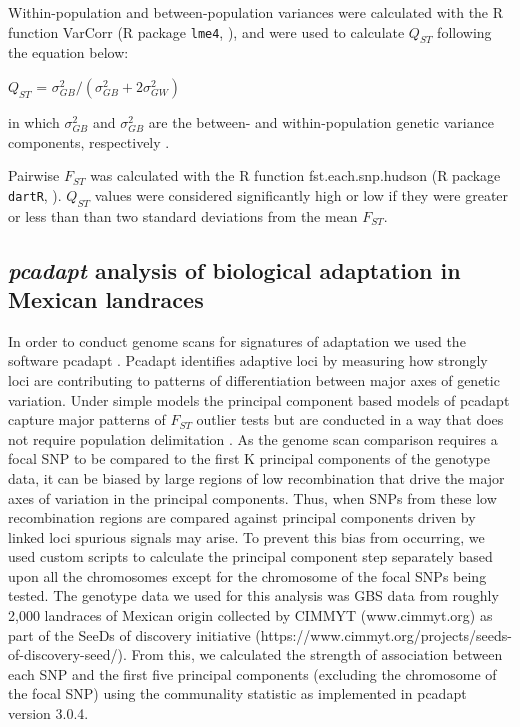 \documentclass[9pt,twocolumn,twoside,lineno]{gsajnl}
\begin{document}
Within-population and between-population variances were calculated with the R function VarCorr (R package \texttt{lme4}, \citealp{bates2014lme4}), and were used to calculate $Q_{ST}$ following the equation below:

\begin{center}
$Q_{ST}$ = \(\sigma^{2}_{GB}/(\sigma^{2}_{GB}+2\sigma^{2}_{GW})\)
\end{center}

\noindent in which $\sigma^{2}_{GB}$ and $\sigma^{2}_{GB}$ are the between- and within-population genetic variance components, respectively \citep{Leinonen2013-ic}.

Pairwise $F_{ST}$ was calculated with the R function fst.each.snp.hudson (R package \texttt{dartR}, \citealp{gruber2018dartr}).
$Q_{ST}$ values were considered significantly high or low if they were greater or less than than two standard deviations from the mean $F_{ST}$.


\subsection{\textit{pcadapt} analysis of biological adaptation in Mexican landraces}

In order to conduct genome scans for signatures of adaptation we used the software pcadapt \citep{Luu2017-ws}.
Pcadapt identifies adaptive loci by measuring how strongly loci are contributing to patterns of differentiation between major axes of genetic variation.
Under simple models the principal component based models of pcadapt capture major patterns of $F_{ST}$ outlier tests but are conducted in a way that does not require population delimitation \citep{duforet2014genome}.
As the genome scan comparison requires a focal SNP to be compared to the first K principal components of the genotype data, it can be biased by large regions of low recombination that drive the major axes of variation in the principal components.
Thus, when SNPs from these low recombination regions are compared against principal components driven by linked loci spurious signals may arise.
To prevent this bias from occurring, we used custom scripts to calculate the principal component step separately based upon all the chromosomes except for the chromosome of the focal SNPs being tested.
The genotype data we used for this analysis was GBS data from roughly 2,000 landraces of Mexican origin collected by CIMMYT (www.cimmyt.org) as part of the SeeDs of discovery initiative (https://www.cimmyt.org/projects/seeds-of-discovery-seed/).
From this, we calculated the strength of association between each SNP and the first five principal components (excluding the chromosome of the focal SNP) using the communality statistic as implemented in pcadapt version 3.0.4.
\end{document}
